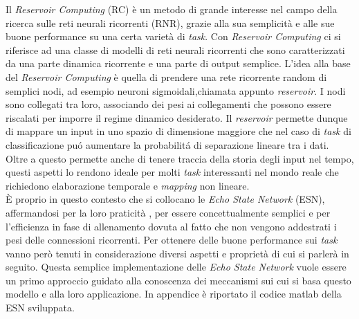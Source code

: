 
Il \textit{Reservoir Computing} (RC) \`e un metodo di grande interesse nel campo della ricerca sulle reti neurali ricorrenti (RNR), grazie alla sua semplicit\`a e alle sue buone performance su una certa variet\`a di \textit{task}. Con \textit{Reservoir Computing} ci si riferisce  ad una classe di modelli di reti neurali ricorrenti che sono caratterizzati da una parte dinamica ricorrente e una parte di output semplice. L'idea alla base del \textit{Reservoir Computing} \`e quella di prendere una rete ricorrente random di semplici nodi, ad esempio neuroni sigmoidali,chiamata appunto \textit{reservoir}. I nodi sono collegati tra loro, associando dei pesi ai collegamenti che possono essere riscalati per imporre il regime dinamico desiderato. Il \textit{reservoir} permette dunque di mappare un input in uno spazio di dimensione maggiore che nel caso di \textit{task} di classificazione pu\'o aumentare la probabilit\'a di separazione lineare tra i dati. Oltre  a questo permette anche di tenere traccia della storia degli input nel tempo, questi aspetti lo rendono ideale per molti \textit{task} interessanti nel mondo reale che richiedono elaborazione temporale e \textit{mapping} non lineare.\\
 È proprio in questo contesto che si collocano le \textit{Echo State Network} (ESN), affermandosi per la loro praticità , per essere concettualmente semplici e per l'efficienza in fase di allenamento dovuta al fatto che non vengono addestrati i pesi delle connessioni ricorrenti. Per ottenere delle buone performance sui \textit{task} vanno però tenuti in considerazione diversi aspetti e proprietà di cui si parlerà in seguito. Questa semplice implementazione delle \textit{Echo State Network} vuole essere un primo approccio guidato alla conoscenza dei meccanismi sui cui si basa questo modello e alla loro applicazione.
In appendice è riportato il codice matlab della ESN sviluppata.



